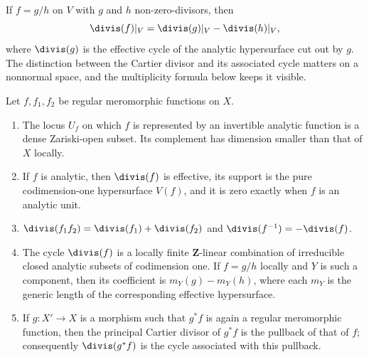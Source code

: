 If $f=g/h$ on $V$ with $g$ and $h$ non-zero-divisors, then
\[
 \divis(f)|_V=\divis(g)|_V-\divis(h)|_V,
\]
where $\divis(g)$ is the effective cycle of the analytic hypersurface cut
out by $g$.  The distinction between the Cartier divisor and its associated
cycle matters on a nonnormal space, and the multiplicity formula below keeps
it visible.

\begin{lemma}
\label{lem:ch15-divisor-basic}
Let $f,f_1,f_2$ be regular meromorphic functions on $X$.
\begin{enumerate}
\item\label{itm:ch15-div-supp} The locus $U_f$ on which $f$ is represented by
  an invertible analytic function is a dense Zariski-open subset.  Its
  complement has dimension smaller than that of $X$ locally.
\item\label{itm:ch15-div-effective} If $f$ is analytic, then
  $\divis(f)$ is effective, its support is the pure codimension-one
  hypersurface $V(f)$, and it is zero exactly when $f$ is an analytic unit.
\item\label{itm:ch15-div-add} $\divis(f_1f_2)=\divis(f_1)+\divis(f_2)$ and
  $\divis(f^{-1})=-\divis(f)$.
\item\label{itm:ch15-div-cycle} The cycle $\divis(f)$ is a locally finite
  $\mathbf Z$-linear combination of irreducible closed analytic subsets of
  codimension one.  If $f=g/h$ locally and $Y$ is such a component, then its
  coefficient is $m_Y(g)-m_Y(h)$, where each $m_Y$ is the generic length of
  the corresponding effective hypersurface.
\item\label{itm:ch15-div-pullback} If $g:X'\to X$ is a morphism such that
  $g^*f$ is again a regular meromorphic function, then
  the principal Cartier divisor of $g^*f$ is the pullback of that of $f$;
  consequently $\divis(g^*f)$ is the cycle associated with this pullback.
\end{enumerate}
\end{lemma}

